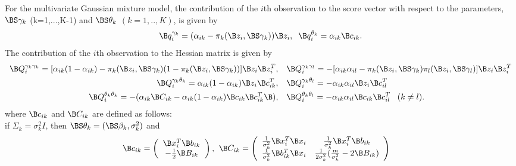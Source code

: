 \begin{theorem}
For the multivariate Gaussian mixture model, the contribution of the $i$th observation to the score vector with respect to the parameters, $\BS\gamma_{k}$ (k=1,...,K-1) and $\BS\theta_{k}$ $(k=1,..,K)$, is given by
\begin{align*}
\B q_{i}^{\gamma_{k}}=(\alpha_{ik}-\pi_{k}(\B z_{i},\BS\gamma_{k}))\B z_{i},\;\; \B q_{i}^{\theta_{k}}=\alpha_{ik}\B c_{ik}.
\end{align*}
The contribution of the $i$th observation to the Hessian matrix is given by
\begin{align*}
\B Q_{i}^{\gamma_{k}\gamma_{k}}=[\alpha_{ik}(1-\alpha_{ik})-\pi_{k}(\B z_{i},\BS\gamma_{k})(1-\pi_{k}(\B z_{i},\BS\gamma_{k}))]\B z_{i}\B z_{i}^{T},& \quad \B Q_{i}^{\gamma_{k}\gamma_{l}}=-[\alpha_{ik}\alpha_{il}-\pi_{k}(\B z_{i},\BS\gamma_{k})\pi_{l}(\B z_{i},\BS\gamma_{l})]\B z_{i}\B z_{i}^{T}\\
\B Q_{i}^{\gamma_{k}\theta_{k}}=\alpha_{ik}(1-\alpha_{ik})\B z_{i}\B c_{ik}^{T},&\quad \B Q_{i}^{\gamma_{k}\theta_{l}}=-\alpha_{ik}\alpha_{il}\B z_{i}\B c_{il}^{T}\\
\B Q_{i}^{\theta_{k}\theta_{k}}=-(\alpha_{ik}\B C_{ik}-\alpha_{ik}(1-\alpha_{ik})\B c_{ik}\B c_{ik}^{T}\B ),&\quad \B Q_{i}^{\theta_{k}\theta_{l}}=-\alpha_{ik}\alpha_{il}\B c_{ik}\B c_{il}^{T}\;\;\;(k\not=l).
\end{align*}
where $\B c_{ik}$ and $\B C_{ik}$ are defined as follows:\\

if $\Sigma_{k}=\sigma_{k}^{2}I$, then $\BS\theta_{k}=(\BS\beta_{k},\sigma^{2}_{k})$ and
\begin{align*}
\B c_{ik}=\left( \begin{array}{c}\B x_{i}^{T}\B b_{ik}\\ -\frac{1}{2} \B B_{ik}\end{array}\right),&\;\;
\B C_{ik}=\left(\begin{array}{cc} \frac{1}{\sigma^{2}_{k}}\B x_{i}^{T}\B x_{i}&\frac{1}{\sigma^{2}_{k}}\B x_{i}^{T}\B b_{ik}\\ \frac{1}{\sigma^{2}_{k}}\B b^{T}_{ik}\B x_{i}&\frac{1}{2\sigma^{2}_{k}}(\frac{m}{\sigma^{2}_{k}}-2\B B_{ik})\end{array} \right)
\end{align*}


\end{theorem}

